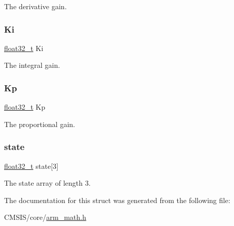 The derivative gain. \mbox{\label{structarm__pid__instance__f32_ad1a1aa1c10a2dca201a3422f82198777}} 
\subsubsection{\texorpdfstring{Ki}{Ki}}
{\footnotesize\ttfamily \mbox{\hyperlink{arm__math_8h_a4611b605e45ab401f02cab15c5e38715}{float32\+\_\+t}} Ki}

The integral gain. \mbox{\label{structarm__pid__instance__f32_abe23f3e122ef5f55398fcf77c793c425}} 
\subsubsection{\texorpdfstring{Kp}{Kp}}
{\footnotesize\ttfamily \mbox{\hyperlink{arm__math_8h_a4611b605e45ab401f02cab15c5e38715}{float32\+\_\+t}} Kp}

The proportional gain. \mbox{\label{structarm__pid__instance__f32_a473556ac6100fc188e77930d56f51062}} 
\subsubsection{\texorpdfstring{state}{state}}
{\footnotesize\ttfamily \mbox{\hyperlink{arm__math_8h_a4611b605e45ab401f02cab15c5e38715}{float32\+\_\+t}} state\mbox{[}3\mbox{]}}

The state array of length 3. 

The documentation for this struct was generated from the following file\+:\begin{DoxyCompactItemize}
\item 
C\+M\+S\+I\+S/core/\mbox{\hyperlink{arm__math_8h}{arm\+\_\+math.\+h}}\end{DoxyCompactItemize}

